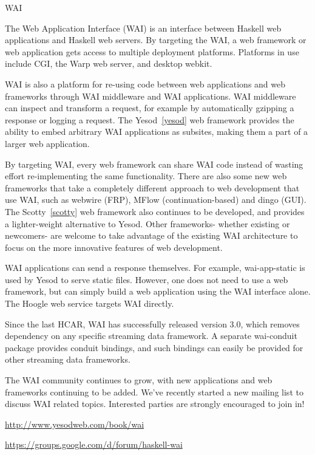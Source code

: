 \begin{hcarentry}{WAI}
\label{wai}
\makeheader

The Web Application Interface (WAI) is an interface between Haskell web
applications and Haskell web servers. By targeting the WAI, a web framework or web application gets access to multiple deployment platforms. Platforms in use include CGI, the Warp web server, and desktop webkit.

WAI is also a platform for re-using code between web applications and web frameworks through WAI middleware and WAI applications. WAI middleware can inspect and transform a request, for example by automatically gzipping a response or logging a request. The Yesod~\cref{yesod} web framework provides the ability to embed arbitrary WAI applications as subsites, making them a part of a larger web application.

By targeting WAI, every web framework can share WAI code instead of wasting
effort re-implementing the same functionality. There are also some new web
frameworks that take a completely different approach to web development that
use WAI, such as webwire (FRP), MFlow (continuation-based) and dingo (GUI).
The Scotty~\cref{scotty} web framework also continues to be developed, and
provides a lighter-weight alternative to Yesod. Other frameworks- whether
existing or newcomers- are welcome to take advantage of the existing WAI
architecture to focus on the more innovative features of web development.

WAI applications can send a response themselves. For example, wai-app-static is used by Yesod to serve static files. However, one does not need to use a web framework, but can simply build a web application using the WAI interface alone. The Hoogle %
web service targets WAI directly.

Since the last HCAR, WAI has successfully released version 3.0, which removes dependency on any specific streaming data framework. A separate wai-conduit package provides conduit bindings, and such bindings can easily be provided for other streaming data frameworks.

The WAI community continues to grow, with new applications and web frameworks continuing to be added. We've recently started a new mailing list to discuss WAI related topics. Interested parties are strongly encouraged to join in!

\FurtherReading
\begin{compactitem}
\item\url{http://www.yesodweb.com/book/wai}
\item\url{https://groups.google.com/d/forum/haskell-wai}
\end{compactitem}
\end{hcarentry}
